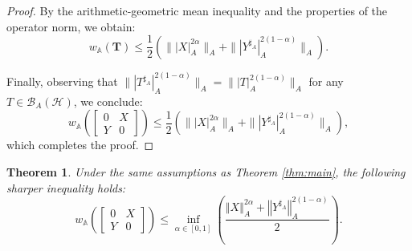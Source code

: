 \documentclass{article}
\newcommand{\norm}[1]{\left\Vert#1\right\Vert}
\newtheorem{theorem}{Theorem}[section]
\begin{document}
\begin{proof}
By the arithmetic-geometric mean inequality and the properties of the operator norm, we obtain:
\[
w_{\mathbb{A}}(\mathbf{T}) \leq \frac{1}{2} \left( \||X|_A^{2\alpha}\|_A + \||Y^{\sharp_A}|_A^{2(1-\alpha)}\|_A \right).
\]

Finally, observing that $\||T^{\sharp_A}|_A^{2(1-\alpha)}\|_A = \||T|_A^{2(1-\alpha)}\|_A$ for any $T \in \mathcal{B}_A(\mathcal{H})$, we conclude:
\[
w_{\mathbb{A}}\left(\begin{bmatrix} 0 & X \\ Y & 0 \end{bmatrix}\right) \leq \frac{1}{2}\left(\||X|_A^{2\alpha}\|_A + \||Y^{\sharp_A}|_A^{2(1-\alpha)}\|_A\right),
\]
which completes the proof.
\end{proof}
\begin{theorem}\label{thm2.8}
\label{thm:refined}
Under the same assumptions as Theorem \ref{thm:main}, the following sharper inequality holds:
\[
w_{\mathbb{A}}\left(\begin{bmatrix} 0 & X \\ Y & 0 \end{bmatrix}\right) \leq \inf_{\alpha \in [0,1]} \left(\frac{\norm{X}_A^{2\alpha} + \norm{Y^{\sharp_A}}_A^{2(1-\alpha)}}{2}\right).
\]
\end{theorem}
\end{document}
